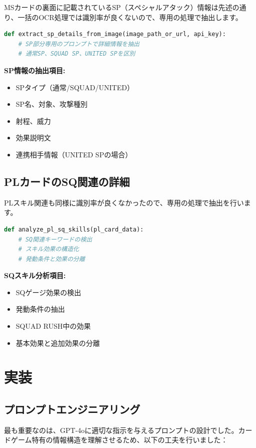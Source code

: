 MSカードの裏面に記載されているSP（スペシャルアタック）情報は先述の通り、一括のOCR処理では識別率が良くないので、専用の処理で抽出します。

\begin{lstlisting}[language=Python]
def extract_sp_details_from_image(image_path_or_url, api_key):
    # SP部分専用のプロンプトで詳細情報を抽出
    # 通常SP、SQUAD SP、UNITED SPを区別
\end{lstlisting}

\textbf{SP情報の抽出項目:}
\begin{itemize}
    \item SPタイプ（通常/SQUAD/UNITED）
    \item SP名、対象、攻撃種別
    \item 射程、威力
    \item 効果説明文
    \item 連携相手情報（UNITED SPの場合）
\end{itemize}

\subsection*{PLカードのSQ関連の詳細}

PLスキル関連も同様に識別率が良くなかったので、専用の処理で抽出を行います。

\begin{lstlisting}[language=Python]
def analyze_pl_sq_skills(pl_card_data):
    # SQ関連キーワードの検出
    # スキル効果の構造化
    # 発動条件と効果の分離
\end{lstlisting}

\textbf{SQスキル分析項目:}
\begin{itemize}
    \item SQゲージ効果の検出
    \item 発動条件の抽出
    \item SQUAD RUSH中の効果
    \item 基本効果と追加効果の分離
\end{itemize}

\section*{実装}

\subsection*{プロンプトエンジニアリング}

最も重要なのは、GPT-4oに適切な指示を与えるプロンプトの設計でした。カードゲーム特有の情報構造を理解させるため、以下の工夫を行いました：

